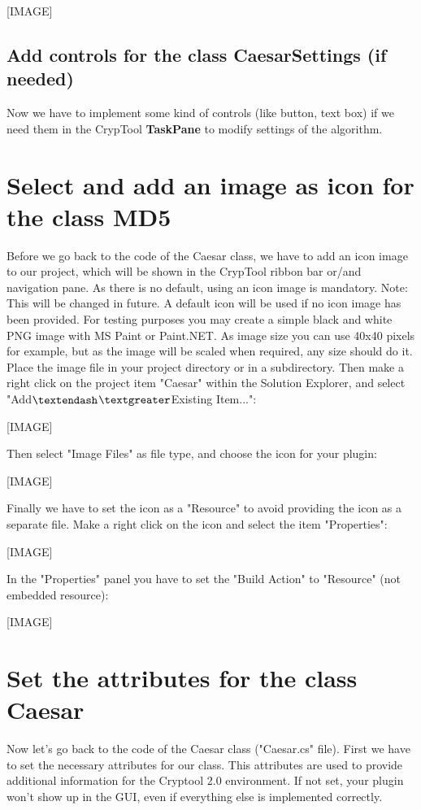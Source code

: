 [IMAGE]

\subsection{Add controls for the class CaesarSettings (if needed)}\label{sec:AddControlsForTheClassMD5SettingsIfNeeded}
Now we have to implement some kind of controls (like button, text box) if we need them in the CrypTool \textbf{TaskPane} to modify settings of the algorithm.
 
\section{Select and add an image as icon for the class MD5}\label{sec:SelectAndAddAnImageAsIconForTheClassMD5}
Before we go back to the code of the Caesar class, we have to add an icon image to our project, which will be shown in the CrypTool ribbon bar or/and navigation pane. As there is no default, using an icon image is mandatory.
Note: This will be changed in future. A default icon will be used if no icon image has been provided.
For testing purposes you may create a simple black and white PNG image with MS Paint or Paint.NET. As image size you can use 40x40 pixels for example, but as the image will be scaled when required, any size should do it. Place the image file in your project directory or in a subdirectory. Then make a right click on the project item "Caesar" within the Solution Explorer, and select "Add$\textendash$$\textgreater$Existing Item...":

[IMAGE]

Then select "Image Files" as file type, and choose the icon for your plugin:

[IMAGE]

Finally we have to set the icon as a "Resource" to avoid providing the icon as a separate file. Make a right click on the icon and select the item "Properties":

[IMAGE]

In the "Properties" panel you have to set the "Build Action" to "Resource" (not embedded resource):

[IMAGE]


\section{Set the attributes for the class Caesar}\label{sec:SetTheAttributesForTheClassMD5}
Now let's go back to the code of the Caesar class ("Caesar.cs" file). First we have to set the necessary attributes for our class. This attributes are used to provide additional information for the Cryptool 2.0 environment. If not set, your plugin won't show up in the GUI, even if everything else is implemented correctly.

